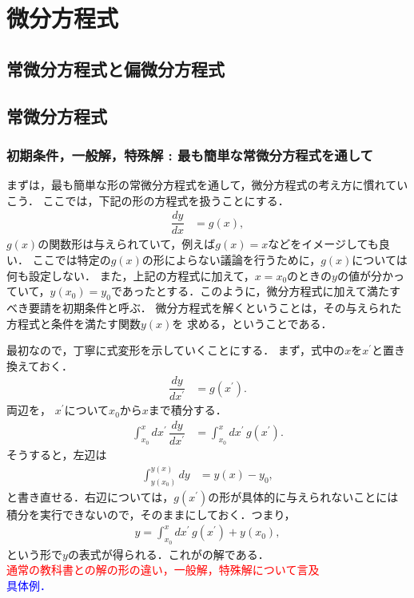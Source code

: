 \chapter{微分方程式}
\section{常微分方程式と偏微分方程式}

\section{常微分方程式}
\subsection{初期条件，一般解，特殊解 : 最も簡単な常微分方程式を通して}
まずは，最も簡単な形の常微分方程式を通して，微分方程式の考え方に慣れていこう．
ここでは，下記の形の方程式を扱うことにする．
\begin{align}
 \dfrac{dy}{dx} &= g(x), \label{eq:PDE_01} 
\end{align}
$g(x)$の関数形は与えられていて，例えば$g(x) = x$などをイメージしても良い．
ここでは特定の$g(x)$の形によらない議論を行うために，$g(x)$については何も設定しない．
また，上記の方程式に加えて，$x = x_0$のときの$y$の値が分かっていて，$y\left(x_0\right) = y_{0}$であったとする．このように，微分方程式に加えて満たすべき要請を初期条件と呼ぶ．
微分方程式を解くということは，その与えられた方程式と条件を満たす関数$y\left(x\right)$を
求める，ということである．

最初なので，丁寧に式変形を示していくことにする．
まず，式中の$x$を$x^\prime$と置き換えておく．
%
\begin{align}
 \dfrac{dy}{dx^{\prime}} & =g\left(x^{\prime}\right).
\end{align}
%
両辺を，
$x^{\prime}$について$x_0$から$x$まで積分する．
\begin{align}
 \int_{x_{0}}^{x}dx^{\prime}\,\dfrac{dy}{dx^{\prime}} & =\int_{x_{0}}^{x}dx^{\prime}\,g\left(x^{\prime}\right).
\end{align}
そうすると，左辺は
\begin{align}
 \int_{y\left(x_{0}\right)}^{y\left(x\right)}dy & =y\left(x\right)-y_{0},
\end{align}
と書き直せる．右辺については，$g(x^\prime)$の形が具体的に与えられないことには
積分を実行できないので，そのままにしておく．つまり，
\begin{align}
 y = \int_{x_0}^{x} dx^\prime \, g(x^\prime) + y\left(x_0\right), 
\end{align}
という形で$y$の表式が得られる．これがの解である．\\
\textcolor{red}{通常の教科書との解の形の違い，一般解，特殊解について言及}\\
\textcolor{blue}{具体例．}
%
